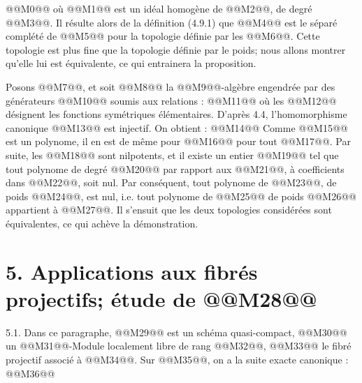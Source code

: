 
@@M0@@
où @@M1@@ est un idéal homogène de @@M2@@, de
degré @@M3@@. Il résulte alors de la définition (4.9.1) que @@M4@@ est le séparé complété de @@M5@@ pour la topologie définie par les @@M6@@. Cette topologie est plus fine que la topologie définie par le poids; nous allons montrer qu'elle lui est équivalente, ce qui entrainera la proposition.

Posons @@M7@@, et soit @@M8@@ la @@M9@@-algèbre engendrée par des générateurs @@M10@@ soumis aux relations :
@@M11@@
où les @@M12@@ désignent les fonctions symétriques élémentaires. D'après 4.4, l'homomorphisme canonique @@M13@@ est injectif. On obtient :
@@M14@@
Comme @@M15@@ est un polynome, il en est de même pour @@M16@@ pour tout @@M17@@. Par suite, les @@M18@@ sont nilpotents, et il existe un entier @@M19@@ tel que tout polynome de degré @@M20@@ par rapport aux @@M21@@, à coefficients dans @@M22@@, soit nul. Par conséquent, tout polynome de @@M23@@, de poids @@M24@@, est nul, i.e. tout polynome de @@M25@@ de poids @@M26@@ appartient à @@M27@@. Il s'ensuit que les deux topologies considérées sont équivalentes, ce qui achève la démonstration.


\section*{5. Applications aux fibrés projectifs; étude de \texorpdfstring{@@M28@@}{f*}}

5.1.
Dans ce paragraphe, @@M29@@ est un schéma quasi-compact, @@M30@@ un @@M31@@-Module localement libre de rang @@M32@@, @@M33@@ le fibré projectif associé à @@M34@@. Sur @@M35@@, on a la suite exacte canonique :
@@M36@@
